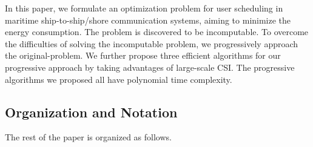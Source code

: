 \documentclass[conference]{IEEEtran}
\begin{document}






In this paper, we formulate an optimization problem for user scheduling in maritime ship-to-ship/shore communication systems, aiming to minimize the energy consumption. %
The problem is discovered to be incomputable. %
To overcome the difficulties of solving the incomputable problem, we progressively approach the original-problem. We further propose three efficient algorithms for our progressive approach by taking advantages of large-scale CSI. The progressive algorithms we proposed all have polynomial time complexity.

\subsection{Organization and Notation}
The rest of the paper is organized as follows.
\end{document}
